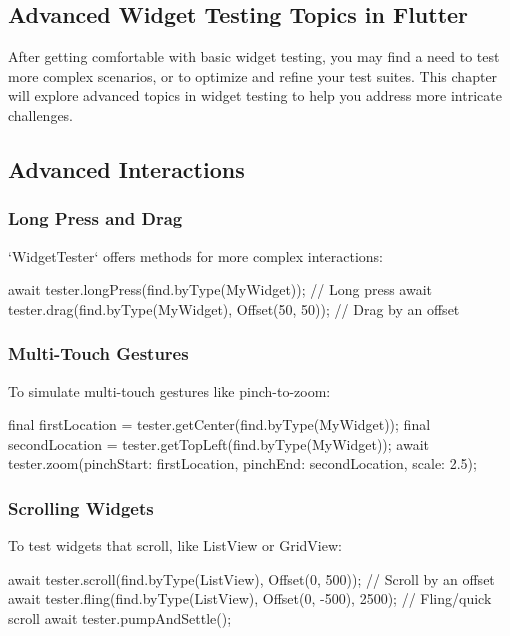 \subsection{Advanced Widget Testing Topics in Flutter}

After getting comfortable with basic widget testing, you may find a need to test more complex scenarios, or to optimize and refine your test suites. 
This chapter will explore advanced topics in widget testing to help you address more intricate challenges.

\subsection*{Advanced Interactions}

\subsubsection*{Long Press and Drag}

`WidgetTester` offers methods for more complex interactions:

\begin{dartcode}
await tester.longPress(find.byType(MyWidget)); // Long press
await tester.drag(find.byType(MyWidget), Offset(50, 50)); // Drag by an offset
\end{dartcode}

\subsubsection*{Multi-Touch Gestures}
To simulate multi-touch gestures like pinch-to-zoom:

\begin{dartcode}
final firstLocation = tester.getCenter(find.byType(MyWidget));
final secondLocation = tester.getTopLeft(find.byType(MyWidget));
await tester.zoom(pinchStart: firstLocation, pinchEnd: secondLocation, scale: 2.5);
\end{dartcode}

\subsubsection*{Scrolling Widgets}

To test widgets that scroll, like ListView or GridView:

\begin{dartcode}
await tester.scroll(find.byType(ListView), Offset(0, 500));  // Scroll by an offset
await tester.fling(find.byType(ListView), Offset(0, -500), 2500);  // Fling/quick scroll
await tester.pumpAndSettle();
\end{dartcode}

